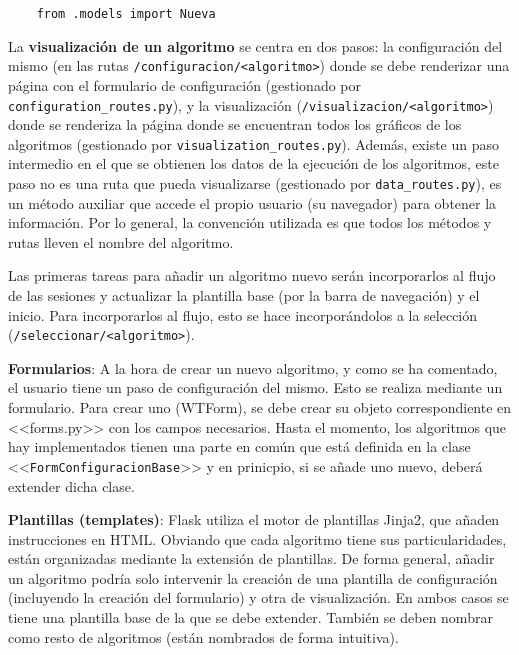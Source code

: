 \begin{tcolorbox}[colback=cyan!5!white,colframe=cyan!75!black,title=Importar modelo (en <<create\_app()>> de \texttt{\_\_init\_\_.py})]
    \begin{verbatim}
    from .models import Nueva
    \end{verbatim}
\end{tcolorbox}

La \textbf{visualización de un algoritmo} se centra en dos pasos: la
configuración del mismo (en las rutas \texttt{/configuracion/<algoritmo>}) donde
se debe renderizar una página con el formulario de configuración (gestionado por
\texttt{configuration\_routes.py}), y la visualización
(\texttt{/visualizacion/<algoritmo>}) donde se renderiza la página donde se
encuentran todos los gráficos de los algoritmos (gestionado por
\texttt{visualization\_routes.py}). Además, existe un paso intermedio en el que
se obtienen los datos de la ejecución de los algoritmos, este paso no es una
ruta que pueda visualizarse (gestionado por \texttt{data\_routes.py}), es un
método auxiliar que accede el propio usuario (su navegador) para obtener la
información. Por lo general, la convención utilizada es que todos los métodos y
rutas lleven el nombre del algoritmo.

Las primeras tareas para añadir un algoritmo nuevo serán incorporarlos al flujo
de las sesiones y actualizar la plantilla base (por la barra de navegación) y el
inicio. Para incorporarlos al flujo, esto se hace incorporándolos a la selección
(\texttt{/seleccionar/<algoritmo>}).

\textbf{Formularios}: A la hora de crear un nuevo algoritmo, y como se ha
comentado, el usuario tiene un paso de configuración del mismo. Esto se realiza
mediante un formulario. Para crear uno (WTForm), se debe crear su objeto
correspondiente en <<forms.py>> con los campos necesarios. Hasta el momento, los
algoritmos que hay implementados tienen una parte en común que está definida en
la clase <<\texttt{FormConfiguracionBase}>> y en prinicpio, si se añade uno
nuevo, deberá extender dicha clase.

\textbf{Plantillas (templates)}: Flask utiliza el motor de plantillas Jinja2,
que añaden instrucciones en HTML. Obviando que cada algoritmo tiene sus
particularidades, están organizadas mediante la extensión de plantillas. De
forma general, añadir un algoritmo podría solo intervenir la creación de una
plantilla de configuración (incluyendo la creación del formulario) y otra de
visualización. En ambos casos se tiene una plantilla base de la que se debe
extender. También se deben nombrar como resto de algoritmos (están nombrados de
forma intuitiva).

